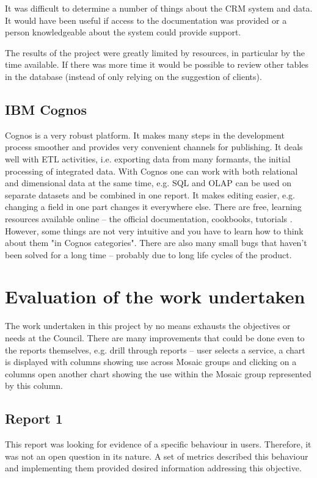 It was difficult to determine a number of things about the CRM system and data. It would have been useful if access to the documentation was provided or a person knowledgeable about the system could provide support.

The results of the project were greatly limited by resources, in particular by the time available. If there was more time it would be possible to review other tables in the database (instead of only relying on the suggestion of clients).
		
		\subsection{IBM Cognos}

Cognos is a very robust platform. It makes many steps in the development process smoother and provides very convenient channels for publishing. It deals well with ETL activities, i.e. exporting data from many formants, the initial processing of integrated data. With Cognos one can work with both relational and dimensional data at the same time, e.g. SQL and OLAP can be used on separate datasets and be combined in one report. It makes editing easier, e.g. changing a field in one part changes it everywhere else. There are free, learning resources available online – the official documentation, cookbooks, tutorials \citep{MIT}. However, some things are not very intuitive and you have to learn how to think about them "in Cognos categories". There are also many small bugs that haven't been solved for a long time – probably due to long life cycles of the product.

	\section{Evaluation of the work undertaken}
	
The work undertaken in this project by no means exhausts the objectives or needs at the Council. There are many improvements that could be done even to the reports themselves, e.g. drill through reports – user selects a service, a chart is displayed with columns showing use across Mosaic groups and clicking on a columns open another chart showing the use within the Mosaic group represented by this column.

		\subsection{Report 1}
		
This report was looking for evidence of a specific behaviour in users. Therefore, it was not an open question in its nature. A set of metrics described this behaviour and implementing them provided desired information addressing this objective.
		
